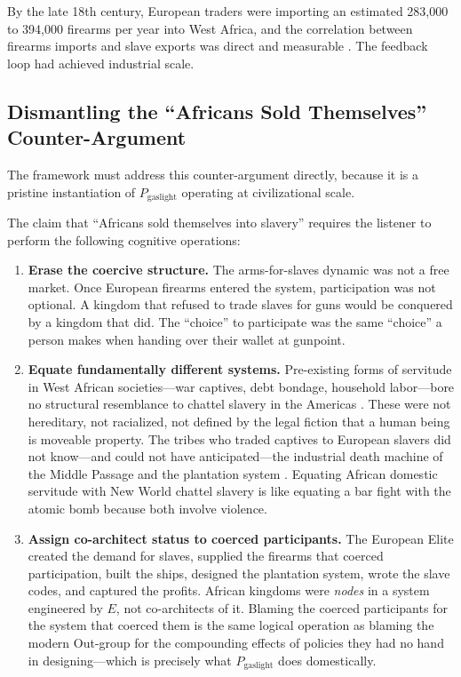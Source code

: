 \documentclass[12pt,openany]{book}
\begin{document}
By the late 18th century, European traders were importing an estimated 283,000 to 394,000 firearms per year into West Africa, and the correlation between firearms imports and slave exports was direct and measurable \cite{inikori}. The feedback loop had achieved industrial scale.

\subsection{Dismantling the ``Africans Sold Themselves'' Counter-Argument}

The framework must address this counter-argument directly, because it is a pristine instantiation of $P_{\text{gaslight}}$ operating at civilizational scale.

The claim that ``Africans sold themselves into slavery'' requires the listener to perform the following cognitive operations:

\begin{enumerate}
    \item \textbf{Erase the coercive structure.} The arms-for-slaves dynamic was not a free market. Once European firearms entered the system, participation was not optional. A kingdom that refused to trade slaves for guns would be conquered by a kingdom that did. The ``choice'' to participate was the same ``choice'' a person makes when handing over their wallet at gunpoint.

    \item \textbf{Equate fundamentally different systems.} Pre-existing forms of servitude in West African societies---war captives, debt bondage, household labor---bore no structural resemblance to chattel slavery in the Americas \cite{lovejoy2012}. These were not hereditary, not racialized, not defined by the legal fiction that a human being is moveable property. The tribes who traded captives to European slavers did not know---and could not have anticipated---the industrial death machine of the Middle Passage and the plantation system \cite{smallwood}. Equating African domestic servitude with New World chattel slavery is like equating a bar fight with the atomic bomb because both involve violence.

    \item \textbf{Assign co-architect status to coerced participants.} The European Elite created the demand for slaves, supplied the firearms that coerced participation, built the ships, designed the plantation system, wrote the slave codes, and captured the profits. African kingdoms were \textit{nodes} in a system engineered by $E$, not co-architects of it. Blaming the coerced participants for the system that coerced them is the same logical operation as blaming the modern Out-group for the compounding effects of policies they had no hand in designing---which is precisely what $P_{\text{gaslight}}$ does domestically.
\end{enumerate}
\end{document}
